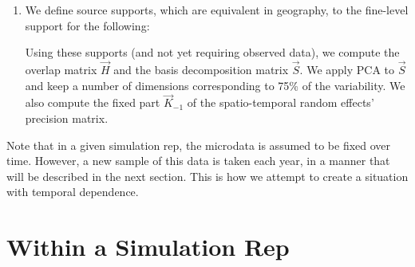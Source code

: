 \documentclass[12pt]{article}
\begin{document}
\begin{enumerate}
\item We define source supports, which are equivalent in geography, to the fine-level support for the following:
%
%
Using these supports (and not yet requiring observed data), we compute the overlap matrix $\vec{H}$ and the basis decomposition matrix $\vec{S}$. We apply PCA to $\vec{S}$ and keep a number of dimensions corresponding to 75\% of the variability. We also compute the fixed part $\vec{K}_{-1}$ of the spatio-temporal random effects' precision matrix.
\end{enumerate}

Note that in a given simulation rep, the microdata is assumed to be fixed over time. However, a new sample of this data is taken each year, in a manner that will be described in the next section. This is how we attempt to create a situation with temporal dependence.


\section{Within a Simulation Rep}
\label{sec:sim-rep}
\end{document}
